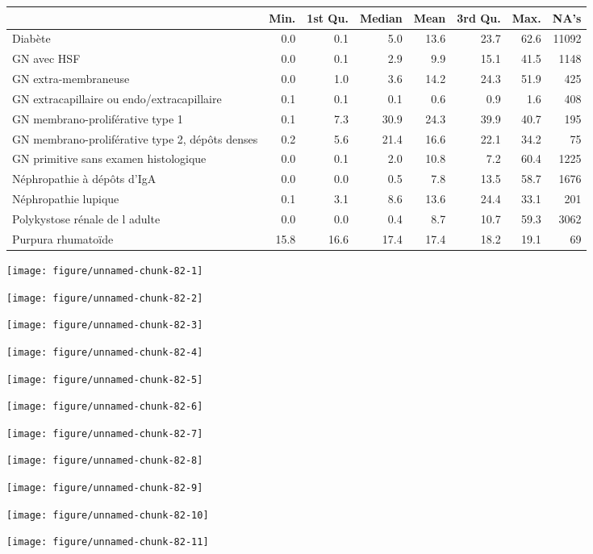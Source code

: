 \documentclass[11pt,a4paper]{article}\usepackage[]{graphicx}\usepackage[]{color}
\makeatletter
\def\maxwidth{ %
  \ifdim\Gin@nat@width>\linewidth
    \linewidth
  \else
    \Gin@nat@width
  \fi
}
\newenvironment{knitrout}{}{} %
\makeatother
\begin{document}
\begin{table}[H]
\centering
\begin{tabular}{lrrrrrrr}
  \hline
 & Min. & 1st Qu. & Median & Mean & 3rd Qu. & Max. & NA's \\ 
  \hline
Diabète & 0.0 & 0.1 & 5.0 & 13.6 & 23.7 & 62.6 & 11092 \\ 
  GN avec HSF & 0.0 & 0.1 & 2.9 & 9.9 & 15.1 & 41.5 & 1148 \\ 
  GN extra-membraneuse & 0.0 & 1.0 & 3.6 & 14.2 & 24.3 & 51.9 & 425 \\ 
  GN extracapillaire ou endo/extracapillaire & 0.1 & 0.1 & 0.1 & 0.6 & 0.9 & 1.6 & 408 \\ 
  GN membrano-proliférative type 1 & 0.1 & 7.3 & 30.9 & 24.3 & 39.9 & 40.7 & 195 \\ 
  GN membrano-proliférative type 2, dépôts denses & 0.2 & 5.6 & 21.4 & 16.6 & 22.1 & 34.2 & 75 \\ 
  GN primitive sans examen histologique & 0.0 & 0.1 & 2.0 & 10.8 & 7.2 & 60.4 & 1225 \\ 
  Néphropathie à dépôts d'IgA & 0.0 & 0.0 & 0.5 & 7.8 & 13.5 & 58.7 & 1676 \\ 
  Néphropathie lupique & 0.1 & 3.1 & 8.6 & 13.6 & 24.4 & 33.1 & 201 \\ 
  Polykystose rénale de l adulte & 0.0 & 0.0 & 0.4 & 8.7 & 10.7 & 59.3 & 3062 \\ 
  Purpura rhumatoïde & 15.8 & 16.6 & 17.4 & 17.4 & 18.2 & 19.1 & 69 \\ 
   \hline
\end{tabular}
\end{table}


\begin{knitrout}
\color{fgcolor}
\texttt{[image: figure/unnamed-chunk-82-1]} 

\texttt{[image: figure/unnamed-chunk-82-2]} 

\texttt{[image: figure/unnamed-chunk-82-3]} 

\texttt{[image: figure/unnamed-chunk-82-4]} 

\texttt{[image: figure/unnamed-chunk-82-5]} 

\texttt{[image: figure/unnamed-chunk-82-6]} 

\texttt{[image: figure/unnamed-chunk-82-7]} 

\texttt{[image: figure/unnamed-chunk-82-8]} 

\texttt{[image: figure/unnamed-chunk-82-9]} 

\texttt{[image: figure/unnamed-chunk-82-10]} 

\texttt{[image: figure/unnamed-chunk-82-11]} 

\end{knitrout}
\end{document}
